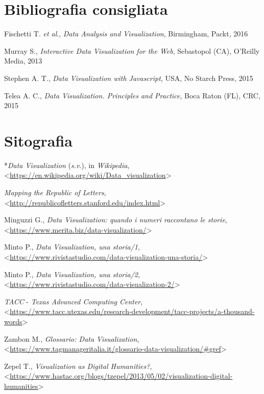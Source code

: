 \documentclass[
  b5paper,
  twoside,
  11pt,
  chapterprefix=false,
  bibliography=totocnumbered,
  listof=flat]{scrbook}
\begin{document}
\hypertarget{bibliografia-consigliata-5}{%
\section*{Bibliografia consigliata}\label{bibliografia-consigliata-5}}

Fischetti T. \emph{et al}., \emph{Data Analysis and Visualization}, Birmingham,
Packt, 2016

Murray S., \emph{Interactive Data Visualization for the Web}, Sebastopol
(CA), O'Reilly Media, 2013

Stephen A. T., \emph{Data Visualization with Javascript}, USA, No Starch
Press, 2015

Telea A. C., \emph{Data Visualization. Principles and Practice}, Boca Raton
(FL), CRC, 2015

\hypertarget{sitografia-7}{%
\section*{Sitografia}\label{sitografia-7}}

*\emph{Data Visualization} (\emph{s.v}.), in \emph{Wikipedia},
\textless{}{\url{https://en.wikipedia.org/wiki/Data_visualization}\textgreater{}}

\emph{Mapping the Republic of Letters,
\textless{}}{\url{http://republicofletters.stanford.edu/index.html}\textgreater{}}

Minguzzi G., \emph{Data Visualization: quando i numeri raccontano le storie},
\textless{}{\url{https://www.merita.biz/data-visualization/}\textgreater{}}

Minto P., \emph{Data Visualization, una storia/1},
\textless{}{\url{https://www.rivistastudio.com/data-visualization-una-storia/}\textgreater{}}

Minto P., \emph{Data Visualization, una storia/2},
\textless{}{\url{https://www.rivistastudio.com/data-visualization-2/}\textgreater{}}

\emph{TACC} - \emph{Texas Advanced Computing Center},
\textless{}{\url{https://www.tacc.utexas.edu/research-development/tacc-projects/a-thousand-words}\textgreater{}}

Zambon M., \emph{Glossario: Data Visualization},
\textless{}{\url{https://www.tagmanageritalia.it/glossario-data-visualization/\#gref}\textgreater{}}

Zepel T., \emph{Visualization as Digital Humanities?},
\textless{}{\url{https://www.hastac.org/blogs/tzepel/2013/05/02/visualization-digital-humanities}\textgreater{}}
\end{document}
